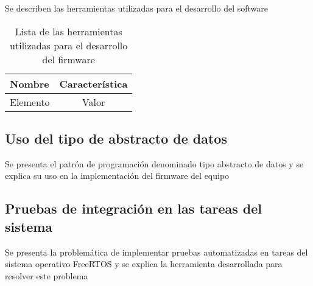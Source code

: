 Se describen las herramientas utilizadas para el desarrollo del software

\begin{table}[ht]
	\centering
	\caption{Lista de las herramientas utilizadas para el desarrollo del firmware}
	\begin{tabular}{l c}    
		\toprule
		\textbf{Nombre} 	& \textbf{Característica}	\\
		\midrule
		Elemento 			& Valor	\\
		\bottomrule
		\hline
	\end{tabular}
	\label{tab:HerramientasDesarrollo}
\end{table}

\subsection{Uso del tipo de abstracto de datos}

Se presenta el patrón de programación denominado tipo abstracto de datos y se explica su uso en la implementación del firmware del equipo

\subsection{Pruebas de integración en las tareas del sistema}

Se presenta la problemática de implementar pruebas automatizadas en tareas del sistema operativo FreeRTOS y se explica la herramienta desarrollada para resolver este problema
